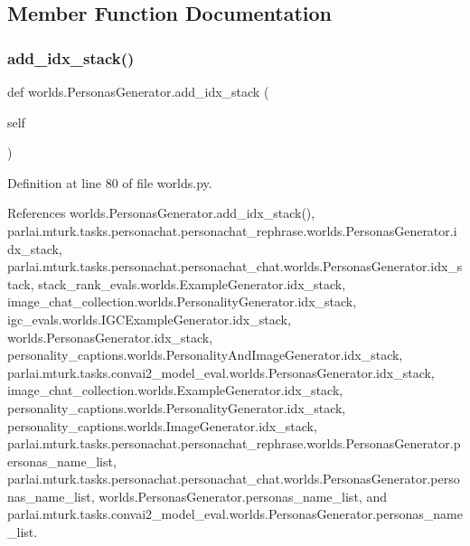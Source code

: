 \subsection{Member Function Documentation}
\mbox{\label{classworlds_1_1PersonasGenerator_a2eecaa6079fea0384e1e8538991196e9}} 
\subsubsection{\texorpdfstring{add\+\_\+idx\+\_\+stack()}{add\_idx\_stack()}\hspace{0.1cm}{\footnotesize\ttfamily [1/2]}}
{\footnotesize\ttfamily def worlds.\+Personas\+Generator.\+add\+\_\+idx\+\_\+stack (\begin{DoxyParamCaption}\item[{}]{self }\end{DoxyParamCaption})}



Definition at line 80 of file worlds.\+py.



References worlds.\+Personas\+Generator.\+add\+\_\+idx\+\_\+stack(), parlai.\+mturk.\+tasks.\+personachat.\+personachat\+\_\+rephrase.\+worlds.\+Personas\+Generator.\+idx\+\_\+stack, parlai.\+mturk.\+tasks.\+personachat.\+personachat\+\_\+chat.\+worlds.\+Personas\+Generator.\+idx\+\_\+stack, stack\+\_\+rank\+\_\+evals.\+worlds.\+Example\+Generator.\+idx\+\_\+stack, image\+\_\+chat\+\_\+collection.\+worlds.\+Personality\+Generator.\+idx\+\_\+stack, igc\+\_\+evals.\+worlds.\+I\+G\+C\+Example\+Generator.\+idx\+\_\+stack, worlds.\+Personas\+Generator.\+idx\+\_\+stack, personality\+\_\+captions.\+worlds.\+Personality\+And\+Image\+Generator.\+idx\+\_\+stack, parlai.\+mturk.\+tasks.\+convai2\+\_\+model\+\_\+eval.\+worlds.\+Personas\+Generator.\+idx\+\_\+stack, image\+\_\+chat\+\_\+collection.\+worlds.\+Example\+Generator.\+idx\+\_\+stack, personality\+\_\+captions.\+worlds.\+Personality\+Generator.\+idx\+\_\+stack, personality\+\_\+captions.\+worlds.\+Image\+Generator.\+idx\+\_\+stack, parlai.\+mturk.\+tasks.\+personachat.\+personachat\+\_\+rephrase.\+worlds.\+Personas\+Generator.\+personas\+\_\+name\+\_\+list, parlai.\+mturk.\+tasks.\+personachat.\+personachat\+\_\+chat.\+worlds.\+Personas\+Generator.\+personas\+\_\+name\+\_\+list, worlds.\+Personas\+Generator.\+personas\+\_\+name\+\_\+list, and parlai.\+mturk.\+tasks.\+convai2\+\_\+model\+\_\+eval.\+worlds.\+Personas\+Generator.\+personas\+\_\+name\+\_\+list.

